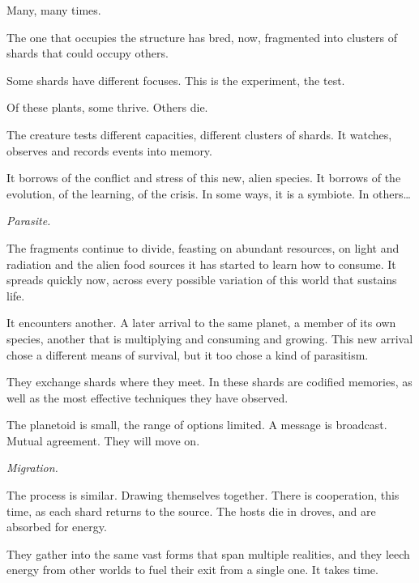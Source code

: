 Many, many times.



The one that occupies the structure has bred, now, fragmented into clusters of shards that could occupy others.



Some shards have different focuses.  This is the experiment, the test.



Of these plants, some thrive.  Others die.



The creature tests different capacities, different clusters of shards.  It watches, observes and records events into memory.



It borrows of the conflict and stress of this new, alien species.  It borrows of the evolution, of the learning, of the crisis.  In some ways, it is a symbiote.  In others\ldots



\emph{Parasite.}



The fragments continue to divide, feasting on abundant resources, on light and radiation and the alien food sources it has started to learn how to consume.  It spreads quickly now, across every possible variation of this world that sustains life.



It encounters another.  A later arrival to the same planet, a member of its own species, another that is multiplying and consuming and growing.  This new arrival chose a different means of survival, but it too chose a kind of parasitism.



They exchange shards where they meet.  In these shards are codified memories, as well as the most effective techniques they have observed.



The planetoid is small, the range of options limited.  A message is broadcast.  Mutual agreement.  They will move on.



\emph{Migration.}



The process is similar.  Drawing themselves together.  There is cooperation, this time, as each shard returns to the source.  The hosts die in droves, and are absorbed for energy.



They gather into the same vast forms that span multiple realities, and they leech energy from other worlds to fuel their exit from a single one.  It takes time.



